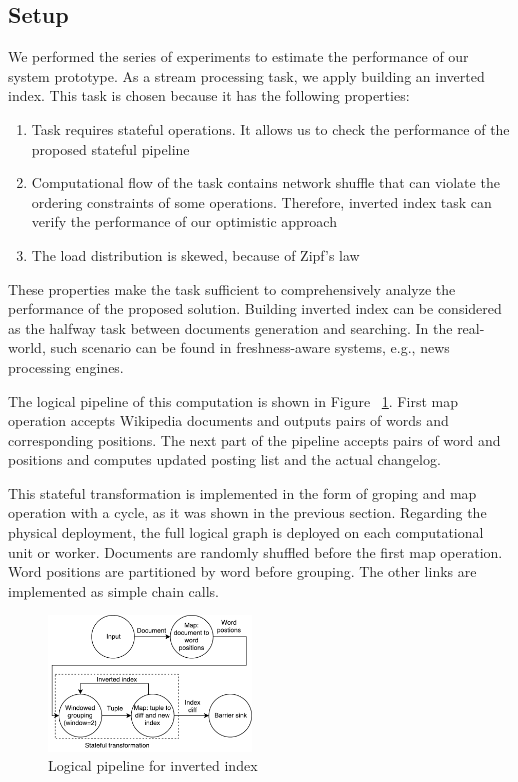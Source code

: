 
\label {fs-experiments}

\subsection{Setup}
We performed the series of experiments to estimate the performance of our system prototype. As a stream processing task, we apply building an inverted index. This task is chosen because it has the following properties:

\begin{enumerate}
    \item Task requires stateful operations. It allows us to check the performance of the proposed stateful pipeline
    \item Computational flow of the task contains network shuffle that can violate the ordering constraints of some operations. Therefore, inverted index task can verify the performance of our optimistic approach
    \item The load distribution is skewed, because of Zipf's law
\end{enumerate}

These properties make the task sufficient to comprehensively analyze the performance of the proposed solution. Building inverted index can be considered as the halfway task between documents generation and searching. In the real-world, such scenario can be found in freshness-aware systems, e.g., news processing engines.

The logical pipeline of this computation is shown in Figure ~\ref{inverted-index}. First map operation accepts Wikipedia documents and outputs pairs of words and corresponding positions. The next part of the pipeline accepts pairs of word and positions and computes updated posting list and the actual changelog. 

This stateful transformation is implemented in the form of groping and map operation with a cycle, as it was shown in the previous section. Regarding the physical deployment, the full logical graph is deployed on each computational unit or worker. Documents are randomly shuffled before the first map operation. Word positions are partitioned by word before grouping. The other links are implemented as simple chain calls.

\begin{figure}[htbp]
  \centering
  \includegraphics[width=0.48\textwidth]{pics/inverted-index}
  \caption{Logical pipeline for inverted index}
  \label {inverted-index}
\end{figure}

